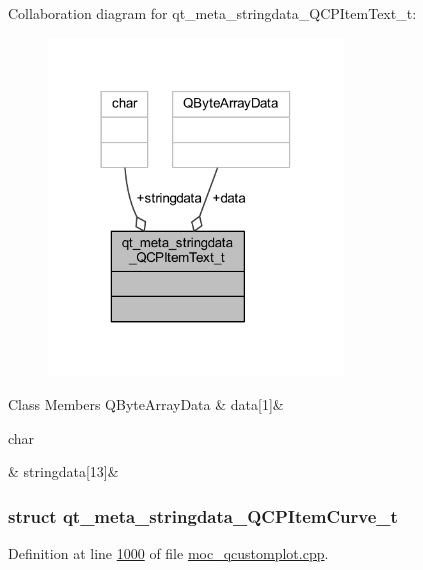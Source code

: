 Collaboration diagram for qt\+\_\+meta\+\_\+stringdata\+\_\+\+Q\+C\+P\+Item\+Text\+\_\+t\+:
\nopagebreak
\begin{figure}[H]
\begin{center}
\leavevmode
\includegraphics[width=222pt]{d9/d90/a00178}
\end{center}
\end{figure}
\begin{DoxyFields}{Class Members}
\hypertarget{a00016_ae37b5edc1ab54bceebcfba0fb33002ec}{Q\+Byte\+Array\+Data}\label{a00016_ae37b5edc1ab54bceebcfba0fb33002ec}
&
data\mbox{[}1\mbox{]}&
\\
\hline

\hypertarget{a00016_aff2bfa25f79dd85cdbd854d9e51371a9}{char}\label{a00016_aff2bfa25f79dd85cdbd854d9e51371a9}
&
stringdata\mbox{[}13\mbox{]}&
\\
\hline

\end{DoxyFields}
\label{d7/d70/a00106}
\hypertarget{a00016_d7/d70/a00106}{}
\subsubsection{struct qt\+\_\+meta\+\_\+stringdata\+\_\+\+Q\+C\+P\+Item\+Curve\+\_\+t}


Definition at line \hyperlink{a00016_source_l01000}{1000} of file \hyperlink{a00016_source}{moc\+\_\+qcustomplot.\+cpp}.



